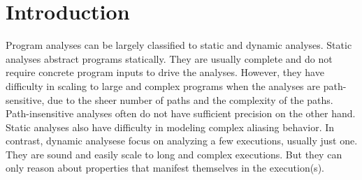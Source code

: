 




\section{Introduction}\label{Se:introduction}
Program analyses can be largely classified to static and dynamic analyses. Static analyses abstract programs statically.
They are usually complete and do not require concrete program inputs to drive the analyses. However, they have difficulty in
scaling to large and complex programs when the analyses are path-sensitive, due to the sheer number of paths and the 
complexity of the paths. Path-insensitive analyses often do not have sufficient precision on the other hand. 
Static analyses also have difficulty in modeling complex aliasing behavior. In contrast, dynamic analysese focus 
on analyzing a few executions, usually just one. They are sound and easily scale to long and complex executions. But they 
can only reason about properties that manifest themselves in the execution(s). 

